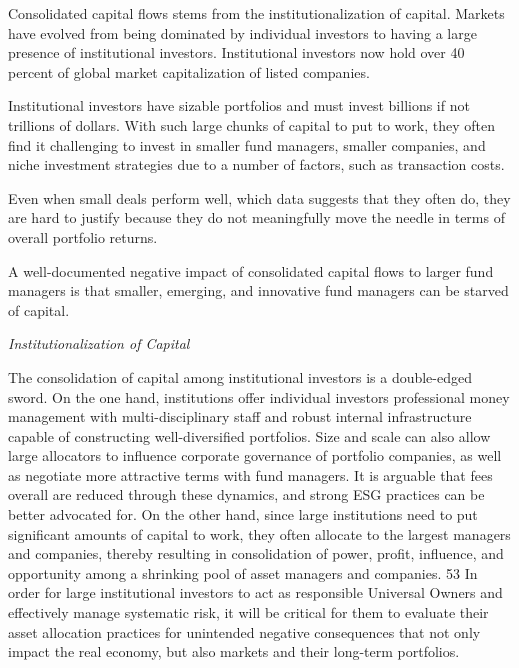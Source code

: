 \documentclass[
]{book}
\begin{document}
Consolidated capital flows stems from the institutionalization of capital.
Markets have evolved from being dominated by individual investors to
having a large presence of institutional investors.
Institutional investors now hold over 40 percent of
global market capitalization of listed companies.

Institutional investors have sizable portfolios and must invest billions
if not trillions of dollars.
With such large chunks of capital to put to work,
they often find it challenging to invest in smaller fund managers,
smaller companies, and niche investment strategies due to a number of factors,
such as transaction costs.

Even when small deals perform well, which data suggests that they often do,
they are hard to justify because they do not meaningfully move the needle
in terms of overall portfolio returns.

A well-documented negative impact of consolidated capital flows to larger
fund managers is that
smaller, emerging, and innovative fund managers can be starved of capital.

\emph{Institutionalization of Capital}

The consolidation of capital among institutional investors is a double-edged sword. On the one hand,
institutions offer individual investors professional money management with multi-disciplinary staff and
robust internal infrastructure capable of constructing well-diversified portfolios. Size and scale can also allow
large allocators to influence corporate governance of portfolio companies, as well as negotiate more
attractive terms with fund managers. It is arguable that fees overall are reduced through these dynamics, and
strong ESG practices can be better advocated for. On the other hand, since large institutions need to put
significant amounts of capital to work, they often allocate to the largest managers and companies, thereby
resulting in consolidation of power, profit, influence, and opportunity among a shrinking pool of asset
managers and companies. 53 In order for large institutional investors to act as responsible Universal Owners
and effectively manage systematic risk, it will be critical for them to evaluate their asset allocation practices
for unintended negative consequences that not only impact the real economy, but also markets and their
long-term portfolios.
\end{document}
